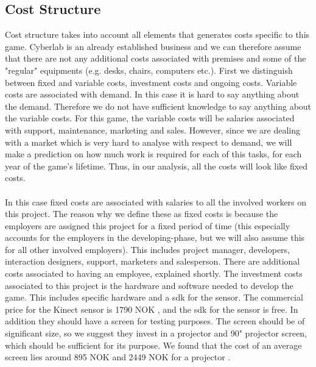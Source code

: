 \subsection{Cost Structure}
Cost structure takes into account all elements that generates costs specific to this game. Cyberlab is an already established business and we can therefore assume that there are not any additional costs associated with premises and some of the "regular" equipments (e.g. desks, chairs, computers etc.). First we distinguish between fixed and variable costs, investment costs and ongoing costs. Variable costs are associated with demand. In this case it is hard to say anything about the demand. Therefore we do not have sufficient knowledge to say anything about the variable costs. For this game, the variable costs will be salaries associated with support, maintenance, marketing and sales. However, since we are dealing with a market which is very hard to analyse with respect to demand, we will make a prediction on how much work is required for each of this tasks, for each year of the game's lifetime. Thus, in our analysis, all the costs will look like fixed costs.  \\ \\
In this case fixed costs are associated with salaries to all the involved workers on this project. The reason why we define these as fixed costs is because the employers are assigned this project for a fixed period of time (this especially accounts for the employers in the developing-phase, but we will also assume this for all other involved employers). This includes project manager, developers, interaction designers, support, marketers and salesperson. There are additional costs associated to having an employee, explained shortly. The investment costs associated to this project is the hardware and software needed to develop the game. This includes specific hardware and a \ac{sdk} for the sensor. The commercial price for the Kinect sensor is 1790 NOK \cite{pricekinect}, and the \ac{sdk} for the sensor is free. In addition they should have a screen for testing purposes. The screen should be of significant size, so we suggest they invest in a projector and 90" projector screen, which should be sufficient for its purpose. We found that the cost of an average screen lies around 895 NOK and 2449 NOK for a projector \cite{priceprojector}\cite{pricescreen}. \\ \\
